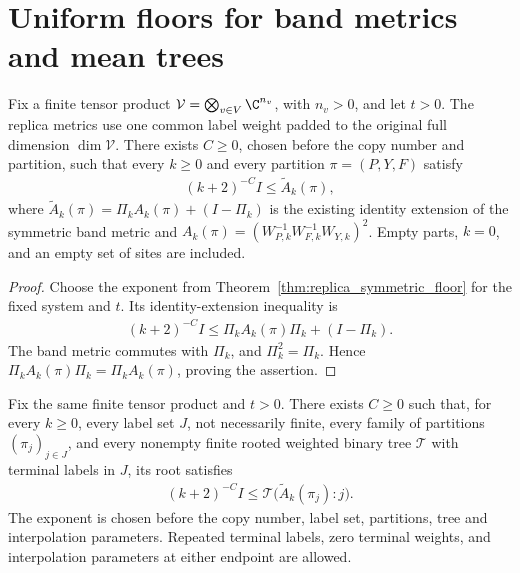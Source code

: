 
\section{Uniform floors for band metrics and mean trees}

\begin{theorem}
    \label{thm:replica_symmetric_band_floor}
    \leanok
    Fix a finite tensor product $\mathcal V=\bigotimes_{v\in V}\C^{n_v}$,
    with $n_v>0$, and let $t>0$. The replica metrics use one common label
    weight padded to the original full dimension $\dim\mathcal V$.
    There exists $C\ge0$, chosen before the copy number and partition,
    such that every $k\ge0$ and every partition $\pi=(P,Y,F)$ satisfy
    \begin{align}
        (k+2)^{-C}I\le\widetilde A_k(\pi),
    \end{align}
    where $\widetilde A_k(\pi)=\Pi_kA_k(\pi)+(I-\Pi_k)$ is the existing
    identity extension of the symmetric band metric and
    $A_k(\pi)=(W_{P,k}^{-1}W_{F,k}^{-1}W_{Y,k})^2$.
    Empty parts, $k=0$, and an empty set of sites are included.
\end{theorem}

\begin{proof}\leanok
    Choose the exponent from Theorem~\ref{thm:replica_symmetric_floor}
    for the fixed system and $t$. Its identity-extension inequality is
    \begin{align}
        (k+2)^{-C}I\le\Pi_kA_k(\pi)\Pi_k+(I-\Pi_k).
    \end{align}
    The band metric commutes with $\Pi_k$, and $\Pi_k^2=\Pi_k$.
    Hence $\Pi_kA_k(\pi)\Pi_k=\Pi_kA_k(\pi)$, proving the assertion.
\end{proof}

\begin{theorem}
    \label{thm:replica_symmetric_mean_floor}
    \leanok
    Fix the same finite tensor product and $t>0$. There exists $C\ge0$
    such that, for every $k\ge0$, every label set $J$, not necessarily finite, every
    family of partitions $(\pi_j)_{j\in J}$, and every nonempty finite
    rooted weighted binary tree $\mathcal T$ with terminal labels in $J$,
    its root satisfies
    \begin{align}
        (k+2)^{-C}I
        \le\mathcal T\bigl(\widetilde A_k(\pi_j):j\bigr).
    \end{align}
    The exponent is chosen before the copy number, label set, partitions,
    tree and interpolation parameters. Repeated terminal labels, zero
    terminal weights, and interpolation parameters at either endpoint
    are allowed.
\end{theorem}

